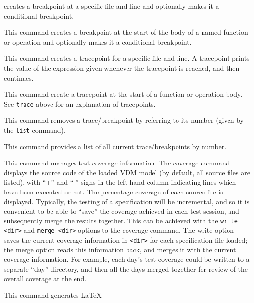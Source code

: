\documentclass{overturerepchap}
\begin{document}
\begin{description}
  creates a breakpoint at a specific file and line and optionally makes
  it a conditional breakpoint.
\item[\texttt{break <function/operation> [<condition>]}:] This command
  creates a breakpoint at the start of the body of a named function or operation and
  optionally makes it a conditional breakpoint.
\item[\texttt{trace [<file>:]<line\#> [<exp>]}:] This command creates a
  tracepoint for a specific file and line. A tracepoint prints the value of the
  expression given whenever the tracepoint is reached, and then continues.
\item[\texttt{trace <function/operation> [<exp>]}:] This command
  create a tracepoint at the start of a function or operation body.
  See \texttt{trace} above for an explanation of tracepoints.
\item[\texttt{remove <breakpoint\#>}:] This command removes a
  trace/breakpoint by referring to its number (given by the
  \texttt{list} command).
\item[\texttt{list}:] This command provides a list of all current
  trace/breakpoints by number.
\item[\texttt{coverage [clear|write <dir>|merge <dir>|<filenames>]}:]
  This command manages test coverage information.
  The coverage command displays the source
  code of the loaded VDM model (by default, all source files are
  listed), with ``+'' and ``-'' signs in the left hand column
  indicating lines which have been executed or not. The percentage
  coverage of each source file
  is displayed. Typically, the
  testing of a specification will be incremental, and so it is
  convenient to be able to ``save'' the coverage achieved in each test
  session, and subsequently merge the results together. This can be
  achieved with the \texttt{write <dir>} and \texttt{merge <dir>} options to the
  coverage command. The write option saves the current coverage
  information in \texttt{<dir>} for each specification file loaded; the merge
  option reads this information back, and merges it with the current
  coverage information. For example, each day's test coverage could be
  written to a separate ``day'' directory, and then all the days merged
  together for review of the overall coverage at the end.
\item[\texttt{latex|latexdoc [<files>]}:] This command generates \LaTeX\

\end{description}
\end{document}
